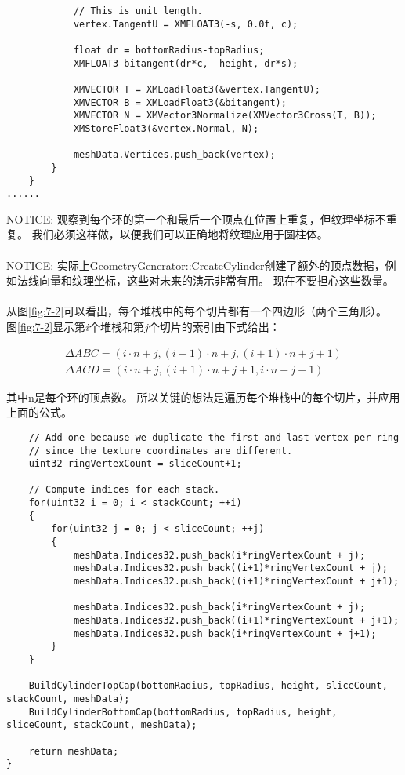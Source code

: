 \begin{lstlisting}
            // This is unit length.
            vertex.TangentU = XMFLOAT3(-s, 0.0f, c);

            float dr = bottomRadius-topRadius;
            XMFLOAT3 bitangent(dr*c, -height, dr*s);

            XMVECTOR T = XMLoadFloat3(&vertex.TangentU);
            XMVECTOR B = XMLoadFloat3(&bitangent);
            XMVECTOR N = XMVector3Normalize(XMVector3Cross(T, B));
            XMStoreFloat3(&vertex.Normal, N);

            meshData.Vertices.push_back(vertex);
        }
    }
......
\end{lstlisting}
\begin{flushleft}
NOTICE: 观察到每个环的第一个和最后一个顶点在位置上重复，但纹理坐标不重复。 我们必须这样做，以便我们可以正确地将纹理应用于圆柱体。\\
~\\
NOTICE: 实际上GeometryGenerator::CreateCylinder创建了额外的顶点数据，例如法线向量和纹理坐标，这些对未来的演示非常有用。 现在不要担心这些数量。\\
~\\
从图\ref{fig:7-2}可以看出，每个堆栈中的每个切片都有一个四边形（两个三角形）。 图\ref{fig:7-2}显示第$i$个堆栈和第$j$个切片的索引由下式给出：\\
\end{flushleft}
\begin{align*}
\Delta ABC = (i\cdot n+j, (i+1)\cdot n+j,(i+1)\cdot n+j+1)\\
\Delta ACD = (i\cdot n+j, (i+1)\cdot n+j+1,i\cdot n+j+1)
\end{align*}
\begin{flushleft}
其中n是每个环的顶点数。 所以关键的想法是遍历每个堆栈中的每个切片，并应用上面的公式。\\
\end{flushleft}
\begin{lstlisting}
    // Add one because we duplicate the first and last vertex per ring
    // since the texture coordinates are different.
    uint32 ringVertexCount = sliceCount+1;

    // Compute indices for each stack.
    for(uint32 i = 0; i < stackCount; ++i)
    {
        for(uint32 j = 0; j < sliceCount; ++j)
        {
            meshData.Indices32.push_back(i*ringVertexCount + j);
            meshData.Indices32.push_back((i+1)*ringVertexCount + j);
            meshData.Indices32.push_back((i+1)*ringVertexCount + j+1);

            meshData.Indices32.push_back(i*ringVertexCount + j);
            meshData.Indices32.push_back((i+1)*ringVertexCount + j+1);
            meshData.Indices32.push_back(i*ringVertexCount + j+1);
        }
    }

    BuildCylinderTopCap(bottomRadius, topRadius, height, sliceCount, stackCount, meshData);
    BuildCylinderBottomCap(bottomRadius, topRadius, height, sliceCount, stackCount, meshData);

    return meshData;
}
\end{lstlisting}
